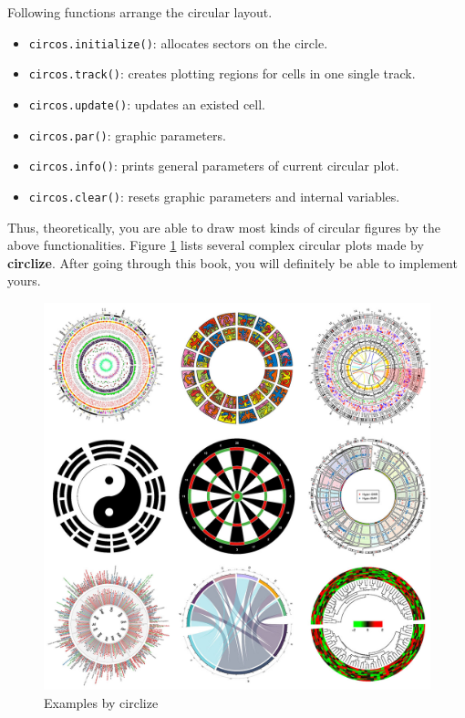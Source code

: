\documentclass[]{book}
\providecommand{\tightlist}{%
  \setlength{\itemsep}{0pt}\setlength{\parskip}{0pt}}
\begin{document}
Following functions arrange the circular layout.

\begin{itemize}
\tightlist
\item
  \texttt{circos.initialize()}: allocates sectors on the circle.
\item
  \texttt{circos.track()}: creates plotting regions for cells in one
  single track.
\item
  \texttt{circos.update()}: updates an existed cell.
\item
  \texttt{circos.par()}: graphic parameters.
\item
  \texttt{circos.info()}: prints general parameters of current circular
  plot.
\item
  \texttt{circos.clear()}: resets graphic parameters and internal
  variables.
\end{itemize}

Thus, theoretically, you are able to draw most kinds of circular figures
by the above functionalities. Figure \ref{fig:circlize-example} lists
several complex circular plots made by \textbf{circlize}. After going
through this book, you will definitely be able to implement yours.

\begin{figure}

{\centering \includegraphics[width=1\linewidth]{images/ciclize_examples} 

}

\caption{Examples by circlize}\label{fig:circlize-example}
\end{figure}
\end{document}
